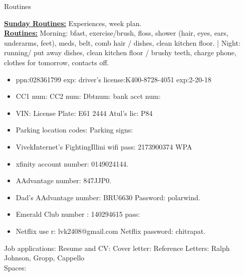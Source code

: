 \documentclass[serif, mathserif, final]{beamer}
\begin{document}
\begin{frame}
  \begin{columns}
    \begin{column}{0.25\linewidth} %
      \begin{block}{Routines}
        
      \textbf{\underline{Sunday Routines:}} Experiences, week plan. \\ 
      \textbf{\underline{Routines:}} Morning: bfast, exercise/brush,
      floss, shower (hair, eyes, ears, underarms, feet), meds, belt,
      comb hair / dishes, clean kitchen floor. |  Night: running/ put
      away dishes, clean kitchen floor / brushy teeth, charge phone,
      clothes for tomorrow, contacts off. \\
  
      \begin{itemize}
      \item \tiny ppn:028361799  exp: driver's license:K400-8728-4051  exp:2-20-18 
      \item \tiny CC1 num: CC2 num: Dbtnum:  bank acct num:  
      \item \tiny VIN:    License Plate:  E61 2444    Atul's lic: P84  
      \item \tiny Parking location codes:   Parking signs: 
      \item \tiny VivekInternet’s FightingIllini  wifi pass: 2173900374 WPA 
      \item \tiny xfinity account number: 0149024144. 
      \item \tiny AAdvantage number: 847JJP0.
      \item \tiny Dad's AAdvantage number: BRU6630 Password: polarwind.
      \item \tiny Emerald Club number :  140294615   pass:  
      \item \tiny Netflix use
        r:  lvk2408@gmail.com  Netflix password: chitrapat. 
      \end{itemize}
      \end{block}


      Job applications: 
      Resume and CV:  
      Cover letter: 
      Reference Letters: Ralph Johnson, Gropp, Cappello \\ 

      Spaces: 


\end{column}
\end{columns}
\end{frame}
\end{document}
